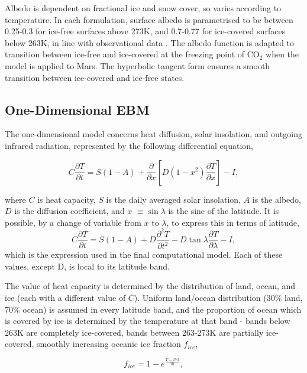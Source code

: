 \documentclass[12pt,onecolumn]{revtex4-2}    %
\begin{document}
Albedo is dependent on fractional ice and snow cover, so varies according to temperature. In each formulation, surface albedo is parametrised to be between 0.25-0.3 for ice-free surfaces above 273K, and 0.7-0.77 for ice-covered surfaces below 263K, in line with observational data \cite{GQ01} \cite{PP12}. The albedo function is adapted to transition between ice-free and ice-covered at the freezing point of $\mathrm{CO_2}$ when the model is applied to Mars. The hyperbolic tangent form ensures a smooth transition between ice-covered and ice-free states.

\subsection{One-Dimensional EBM}
The one-dimensional model concerns heat diffusion, solar insolation, and outgoing infrared radiation, represented by the following differential equation,

\begin{equation}
C \frac{\partial T}{\partial t} = S(1-A) + \frac{\partial}{\partial x} [D(1-x^{2})\frac{\partial T}{\partial x}] - I,
\end{equation}

where $C$ is heat capacity, $S$ is the daily averaged solar insolation, $A$ is the albedo, $D$ is the diffusion coefficient, and $x$ $\equiv \sin\lambda$ is the sine of the latitude. It is possible, by a change of variable from $x$ to $\lambda$, to express this in terms of latitude,
\begin{equation}
C \frac{\partial T}{\partial t} = S(1-A) + D\frac{\partial^2 T}{\partial t^2} - D\tan\lambda\frac{\partial T}{\partial \lambda} - I,
\end{equation}
which is the expression used in the final computational model. Each of these values, except D, is local to its latitude band.
\

The value of heat capacity is determined by the distribution of land, ocean, and ice (each with a different value of $C$). Uniform land/ocean distribution (30\% land, 70\% ocean) is assumed in every latitude band, and the proportion of ocean which is covered by ice is determined by the temperature at that band - bands below 263K are completely ice-covered, bands between 263-273K are partially ice-covered, smoothly increasing oceanic ice fraction $f_{ice}$,

\begin{equation}
f_{ice} = 1 - e^{\frac{T-273}{10}},
\end{equation}
\end{document}
